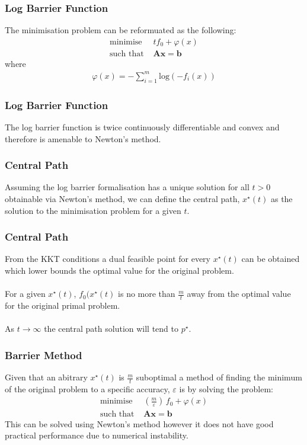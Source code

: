 \documentclass{beamer}
\begin{document}
\begin{frame}
    \frametitle{Log Barrier Function}
    The minimisation problem can be reformuated as the following:
    \begin{align*}
        \text{minimise } \, &t f_{0} +
        \varphi(x)\\
        \text{such that } & \mathbf{A}\mathbf{x} =\mathbf{b}
    \end{align*}
    where
    \begin{align*}
        \varphi(x) = - \sum\limits_{i=1}^{m}\text{log}(-f_{i}(x))
    \end{align*}
\end{frame}

\begin{frame}
    \frametitle{Log Barrier Function}
    The log barrier function is twice continuously differentiable and convex
    and therefore is amenable to Newton's method.
\end{frame}


\begin{frame}
    \frametitle{Central Path}
    Assuming the log barrier formalisation has a unique solution for all
    $t > 0$ obtainable via Newton's method, we can define the central path,
    $x^{\star}(t)$ as the solution to the minimisation problem for a given
    $t$.
\end{frame}

\begin{frame}
    \frametitle{Central Path}
    From the KKT conditions a dual feasible point for every
    $x^{\star}(t)$ can be obtained which lower bounds the optimal value for
    the original problem.
    \\~\\
    For a given $x^{\star}(t)$, $f_{0}(x^{\star}(t)$ is no more than
    $\frac{m}{t}$ away from the optimal value for the original primal problem.
    \\~\\
    As $t \rightarrow \infty$ the central path solution will tend to
    $p^{\star}$.
\end{frame}

\begin{frame}
    \frametitle{Barrier Method}
    Given that an abitrary $x^{\star}(t)$ is $\frac{m}{t}$ suboptimal a method of
    finding the minimum of the original problem to a specific accuracy,
    $\varepsilon$ is by solving the problem:
    \begin{align*}
        \text{minimise } \, &\left(\frac{m}{\varepsilon}\right)\,f_{0} +
        \varphi(x)\\
        \text{such that } & \mathbf{A}\mathbf{x} =\mathbf{b}
    \end{align*}
    This can be solved using Newton's method however it does not have good
    practical performance due to numerical instability.
\end{frame}
\end{document}
